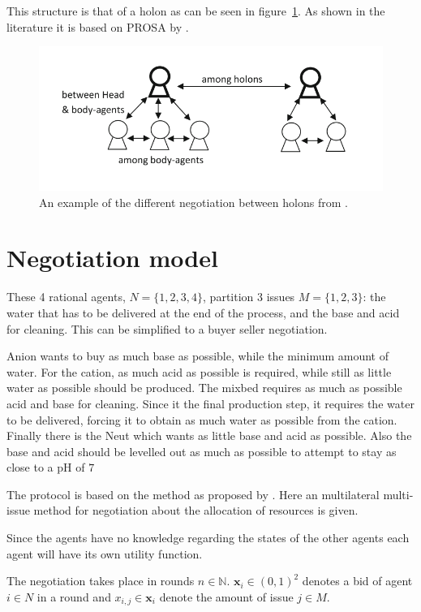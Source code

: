 This structure is that of a holon as can be seen in figure~\ref{fig:holonexample}. As shown in the literature it is based on PROSA by \citet{van1998reference}.
\begin{figure}
	\centering
	\includegraphics[width=0.7\linewidth]{img/holon_example}
	\caption{An example of the different negotiation between holons from \citet{beheshti2016negotiations}.}
	\label{fig:holonexample}
\end{figure}

\section{Negotiation model}
These 4 rational agents, $N = \{1,2,3, 4\}$, partition 3 issues $M=\{1,2,3\}$: the water that has to be delivered at the end of the process, and the base and acid for cleaning.  This can be simplified to a buyer seller negotiation.

Anion wants to buy as much base as possible, while the minimum amount of water. For the cation, as much acid as possible is required, while still as little water as possible should be produced. The mixbed requires as much as possible acid and base for cleaning. Since it the final production step, it requires the water to be delivered, forcing it to obtain as much water as possible from the cation. Finally there is the Neut which wants as little base and acid as possible. Also the base and acid should be levelled out as much as possible to attempt to stay as close to a pH of $7$

The protocol is based on the method as proposed by \citet{wu2009efficient}. Here an multilateral multi-issue method for negotiation about the allocation of resources is given. 

Since the agents have no knowledge regarding the states of the other agents each agent will have its own utility function.

The negotiation takes place in rounds $n\in \mathbb{N} $. $\mathbf{x}_i \in (0,1)^2$ denotes a bid of agent $i \in N$ in a round and $x_{i,j}\in \mathbf{x}_i$  denote the amount of issue $j \in M$.

